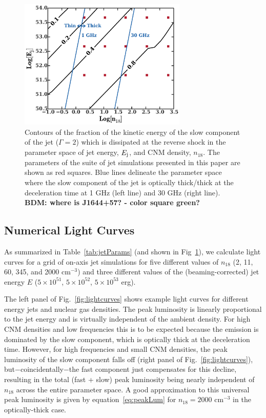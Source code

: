 \documentclass[usenatbib,fleqn]{mnras}
\begin{document}
\begin{figure}
\includegraphics[width=8cm]{diss.pdf}
\caption{\label{fig:diss} Contours of the fraction of the kinetic
  energy of the slow component of the jet ($\Gamma=2$) which is
  dissipated at the reverse shock in the parameter space of jet
  energy, $E_{\rm j}$, and CNM density, $n_{18}$.  The parameters of
  the suite of jet simulations presented in this paper are shown as
  red squares.  Blue lines delineate the parameter space where the
  slow component of the jet is optically thick/thick at the
  deceleration time at 1 GHz (left line) and 30 GHz (right line).
  {\bf BDM: where is J1644+57? - color square green?}}
\end{figure}


\subsection{Numerical Light Curves}
\label{sec:numResults}
As summarized in Table~\ref{tab:jetParams} (and shown in
Fig~\ref{fig:diss}), we calculate light curves for a grid of on-axis
jet simulations for five different values of $n_{18}$ (2, 11, 60, 345,
and 2000 cm$^{-3}$) and three different values of the
(beaming-corrected) jet energy $E$ ($5\times 10^{51}$, $5\times
10^{52}$, $5\times 10^{53}$ erg).

The left panel of Fig.~\ref{fig:lightcurves} shows example light
curves for different energy jets and nuclear gas densities. The peak
luminosity is linearly proportional to the jet energy and is virtually
independent of the ambient density.  For high CNM densities and low
frequencies this is to be expected because the emission is dominated
by the slow component, which is optically thick at the deceleration
time.  However, for high frequencies and small CNM densities, the peak
luminosity of the slow component falls off (right panel of
Fig.~\ref{fig:lightcurves}), but$-$coincidentally$-$the fast component
just compensates for this decline, resulting in the total (fast +
slow) peak luminosity being nearly independent of $n_{18}$ across the
entire parameter space.  A good approximation to this universal peak
luminosity is given by equation~\ref{eq:peakLum} for $n_{18}=2000$
cm$^{-3}$ in the optically-thick case.
\end{document}
